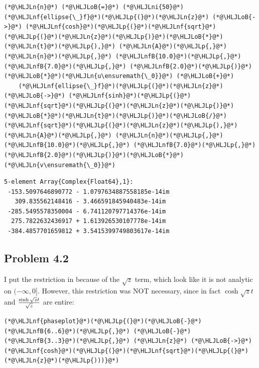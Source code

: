 \documentclass[12pt,a4paper]{article}
\newcommand{\HLJLn}[1]{#1}
\newcommand{\HLJLnf}[1]{\textcolor[RGB]{66,102,213}{#1}}
\newcommand{\HLJLnfB}[1]{\textcolor[RGB]{59,151,46}{#1}}
\newcommand{\HLJLni}[1]{\textcolor[RGB]{59,151,46}{#1}}
\newcommand{\HLJLoB}[1]{\textcolor[RGB]{102,102,102}{\textbf{#1}}}
\newcommand{\HLJLp}[1]{#1}
\begin{document}
\begin{lstlisting}
(*@\HLJLn{n}@*) (*@\HLJLoB{=}@*) (*@\HLJLni{50}@*)
(*@\HLJLnf{ellipse{\_}f}@*)(*@\HLJLp{(}@*)(*@\HLJLn{z}@*) (*@\HLJLoB{->}@*) (*@\HLJLnf{cosh}@*)(*@\HLJLp{(}@*)(*@\HLJLnf{sqrt}@*)(*@\HLJLp{(}@*)(*@\HLJLn{z}@*)(*@\HLJLp{)}@*)(*@\HLJLoB{*}@*)(*@\HLJLn{t}@*)(*@\HLJLp{),}@*) (*@\HLJLn{A}@*)(*@\HLJLp{,}@*) (*@\HLJLn{n}@*)(*@\HLJLp{,}@*) (*@\HLJLnfB{10.0}@*)(*@\HLJLp{,}@*) (*@\HLJLnfB{7.0}@*)(*@\HLJLp{,}@*) (*@\HLJLnfB{2.0}@*)(*@\HLJLp{)}@*)(*@\HLJLoB{*}@*)(*@\HLJLn{u\ensuremath{\_0}}@*) (*@\HLJLoB{+}@*)
    (*@\HLJLnf{ellipse{\_}f}@*)(*@\HLJLp{(}@*)(*@\HLJLn{z}@*) (*@\HLJLoB{->}@*) (*@\HLJLnf{sinh}@*)(*@\HLJLp{(}@*)(*@\HLJLnf{sqrt}@*)(*@\HLJLp{(}@*)(*@\HLJLn{z}@*)(*@\HLJLp{)}@*)(*@\HLJLoB{*}@*)(*@\HLJLn{t}@*)(*@\HLJLp{)}@*)(*@\HLJLoB{/}@*)(*@\HLJLnf{sqrt}@*)(*@\HLJLp{(}@*)(*@\HLJLn{z}@*)(*@\HLJLp{),}@*) (*@\HLJLn{A}@*)(*@\HLJLp{,}@*) (*@\HLJLn{n}@*)(*@\HLJLp{,}@*) (*@\HLJLnfB{10.0}@*)(*@\HLJLp{,}@*) (*@\HLJLnfB{7.0}@*)(*@\HLJLp{,}@*) (*@\HLJLnfB{2.0}@*)(*@\HLJLp{)}@*)(*@\HLJLoB{*}@*)(*@\HLJLn{v\ensuremath{\_0}}@*)
\end{lstlisting}

\begin{lstlisting}
5-element Array{Complex{Float64},1}:
 -153.5097646890772 - 1.0797634887558185e-14im
   309.835562148416 - 3.466591845940483e-14im 
 -285.5495578350004 - 6.741120797714376e-14im 
  275.7822632436917 + 1.613926530107778e-14im 
 -384.4857701659812 + 3.5415399749803617e-14im
\end{lstlisting}


\subsection{Problem 4.2}
I put the restriction in because of the $\sqrt z$ term, which look like it is not analytic on $(-\infty,0]$. However, this restriction was NOT necessary, since in fact $\cosh \sqrt z t$ and ${\sinh \sqrt z t \over \sqrt z}$ are entire:


\begin{lstlisting}
(*@\HLJLnf{phaseplot}@*)(*@\HLJLp{(}@*)(*@\HLJLoB{-}@*)(*@\HLJLnfB{6..6}@*)(*@\HLJLp{,}@*) (*@\HLJLoB{-}@*)(*@\HLJLnfB{3..3}@*)(*@\HLJLp{,}@*) (*@\HLJLn{z}@*) (*@\HLJLoB{->}@*) (*@\HLJLnf{cosh}@*)(*@\HLJLp{(}@*)(*@\HLJLnf{sqrt}@*)(*@\HLJLp{(}@*)(*@\HLJLn{z}@*)(*@\HLJLp{)))}@*)
\end{lstlisting}
\end{document}

